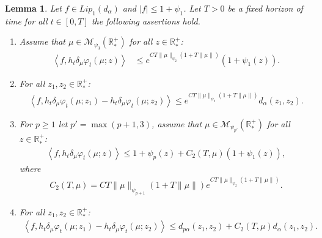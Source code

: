 \documentclass[11pt,a4paper]{article}
\newcommand{\RRP}{\mathbb{R}^+_*}
\newcommand{\MC}{\mathcal{M}}
\newcommand{\brac}[1]{\left\langle#1\right\rangle}
\newtheorem{lemma}[theorem]{Lemma}
\begin{document}
\begin{lemma}\label{lem:wass-rescaled-derivative}
    Let $f \in Lip_1(d_\alpha)$ and $|f| \leq 1 + \psi_1$. Let $T > 0$ be a fixed horizon of time for all $t \in [0,T]$ the following assertions hold.
    \begin{enumerate}[label=(\roman*)]
        \item Assume that $\mu \in \MC_{\psi_3}(\RRP)$ for all $z \in \RRP$:
        \begin{align*}
            \brac{f,h_t\delta_\mu \varphi_t(\mu;z)} &\leq e^{CT\|\mu\|_{\psi_2}\left(1 + T\|\mu\|\right)} (1 + \psi_1(z)).
        \end{align*}
        \item For all $z_1,z_2 \in \RRP$:
            \begin{align*}
                \brac{f,h_t\delta_\mu \varphi_t(\mu;z_1) - h_t\delta_\mu \varphi_t(\mu;z_2)} \leq e^{CT\|\mu\|_{\psi_2}\left(1 + T\|\mu\|\right)} d_\alpha(z_1,z_2) .
            \end{align*}
        \item For $p \geq 1$ let $p' = \max(p+1,3)$, assume that $\mu \in \MC_{\psi_{p'}}(\RRP)$ for all $z \in \RRP$:
            \begin{align*}
                \brac{f,h_t\delta_\mu \varphi_t(\mu;z)} \leq  1 + \psi_p(z) + C_2(T,\mu )(1 + \psi_1(z)),
            \end{align*}
             where 
            \begin{align*}
                C_2(T,\mu ) = CT \|\mu\|_{\psi_{p+1}}\left(1 + T\|\mu\|\right)e^{CT\|\mu\|_{\psi_{2}}\left(1 + T\|\mu\|\right)}.
            \end{align*}
        \item For all $z_1,z_2 \in \RRP$:
            \begin{align*}
                \brac{f,h_t\delta_\mu \varphi_t(\mu;z_1) - h_t\delta_\mu \varphi_t(\mu;z_2)} \leq d_{p\alpha}(z_1,z_2) + C_2(T,\mu ) d_\alpha(z_1,z_2).
            \end{align*}
    \end{enumerate}
\end{lemma}
\end{document}
